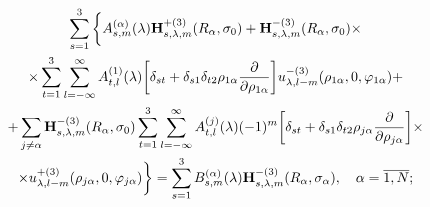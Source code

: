 \begin{multline}
\sum\limits_{s = 1}^3 \bigg\{  A_{s,m}^{(\alpha )}(\lambda ){\bf{H}}_{s,\lambda ,m}^{ + (3)}({R_\alpha },{\sigma _0}) + {\bf{H}}_{s,\lambda ,m}^{ - (3)}({R_\alpha },{\sigma _0}) \times \\
\times \sum\limits_{t = 1}^3 {\sum\limits_{l =  - \infty }^\infty  {A_{t,l}^{(1)}} } (\lambda )\bigg[{\delta _{st}} + {\delta _{s1}}{\delta _{t2}}{\rho _{1\alpha }}\frac{\partial }{{\partial {\rho _{1\alpha }}}}\bigg]u_{\lambda ,l - m}^{ - (3)}({\rho _{1\alpha }},0,{\varphi _{1\alpha }}) + \\
+ \sum\limits_{j \ne \alpha } {{\bf{H}}_{s,\lambda ,m}^{ - (3)}} ({R_\alpha },{\sigma _0})\sum\limits_{t = 1}^3 {\sum\limits_{l =  - \infty }^\infty  {A_{t,l}^{(j)}} } (\lambda ){( - 1)^m}\bigg[{\delta _{st}} + {\delta _{s1}}{\delta _{t2}}{\rho _{j\alpha }}\frac{\partial }{{\partial {\rho _{j\alpha }}}}\bigg] \times \\
\times u_{\lambda ,l - m}^{ + (3)}({\rho _{j\alpha }},0,{\varphi _{j\alpha }})\bigg\}  = \sum\limits_{s = 1}^3 {B_{s,m}^{(\alpha )}} (\lambda ){\bf{H}}_{s,\lambda ,m}^{ - (3)}({R_\alpha },{\sigma _\alpha }),\;\;\;{\mkern 1mu} {\kern 1pt} \alpha  = \overline {1,N};
\end{multline}

